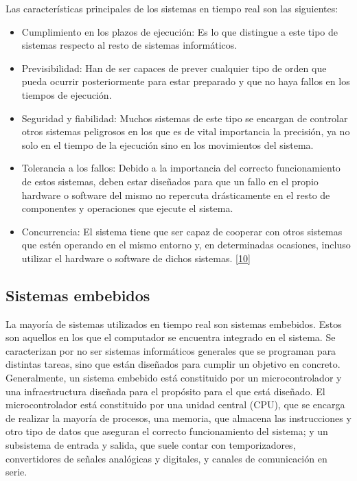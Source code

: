 \documentclass[a4paper,11pt,spanish]{sphinxmanual}
\begin{document}
\sphinxAtStartPar
Las características principales de los sistemas en tiempo real son las
siguientes:
\begin{itemize}
\item {} 
\sphinxAtStartPar
Cumplimiento en los plazos de ejecución: Es lo que distingue a este
tipo de sistemas respecto al resto de sistemas informáticos.

\item {} 
\sphinxAtStartPar
Previsibilidad: Han de ser capaces de prever cualquier tipo de orden
que pueda ocurrir posteriormente para estar preparado y que no haya
fallos en los tiempos de ejecución.

\item {} 
\sphinxAtStartPar
Seguridad y fiabilidad: Muchos sistemas de este tipo se encargan de
controlar otros sistemas peligrosos en los que es de vital
importancia la precisión, ya no solo en el tiempo de la ejecución
sino en los movimientos del sistema.

\item {} 
\sphinxAtStartPar
Tolerancia a los fallos: Debido a la importancia del correcto
funcionamiento de estos sistemas, deben estar diseñados para que un
fallo en el propio hardware o software del mismo no repercuta
drásticamente en el resto de componentes y operaciones que ejecute el
sistema.

\item {} 
\sphinxAtStartPar
Concurrencia: El sistema tiene que ser capaz de cooperar con otros
sistemas que estén operando en el mismo entorno y, en determinadas
ocasiones, incluso utilizar el hardware o software de dichos
sistemas. {[}\hyperlink{cite.marco_teorico_y_estado_del_arte:id8}{10}{]}

\end{itemize}


\subsection{Sistemas embebidos}
\label{\detokenize{marco_teorico_y_estado_del_arte:sistemas-embebidos}}
\sphinxAtStartPar
La mayoría de sistemas utilizados en tiempo real son sistemas embebidos.
Estos son aquellos en los que el computador se encuentra integrado en el
sistema. Se caracterizan por no ser sistemas informáticos generales que
se programan para distintas tareas, sino que están diseñados para
cumplir un objetivo en concreto. Generalmente, un sistema embebido está
constituido por un microcontrolador y una infraestructura diseñada para
el propósito para el que está diseñado. El microcontrolador está
constituido por una unidad central (CPU), que se encarga de realizar la
mayoría de procesos, una memoria, que almacena las instrucciones y otro
tipo de datos que aseguran el correcto funcionamiento del sistema; y un
subsistema de entrada y salida, que suele contar con temporizadores,
convertidores de señales analógicas y digitales, y canales de
comunicación en serie.
\end{document}
